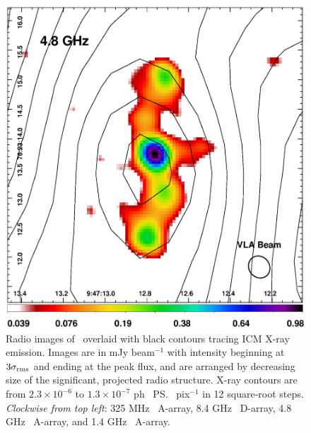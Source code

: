 \begin{figure}
\begin{center}
\begin{minipage}{0.495\linewidth}
      \includegraphics*[width=\textwidth, trim=0mm 0mm 0mm 0mm, clip]{4.8.ps}
    \end{minipage}
     \caption{Radio images of \rbs\ overlaid with black contours
       tracing ICM X-ray emission. Images are in mJy beam$^{-1}$ with
       intensity beginning at $3\sigma_{\rm{rms}}$ and ending at the
       peak flux, and are arranged by decreasing size of the
       significant, projected radio structure. X-ray contours are from
       $2.3 \times 10^{-6}$ to $1.3 \times 10^{-7}$ ph
       \pcmsq\ \ps\ pix$^{-1}$ in 12 square-root steps. {\it{Clockwise
           from top left}}: 325 MHz \vla\ A-array, 8.4 GHz
       \vla\ D-array, 4.8 GHz \vla\ A-array, and 1.4 GHz
       \vla\ A-array.}
    \label{fig:composite}
  \end{center}
\end{figure}

